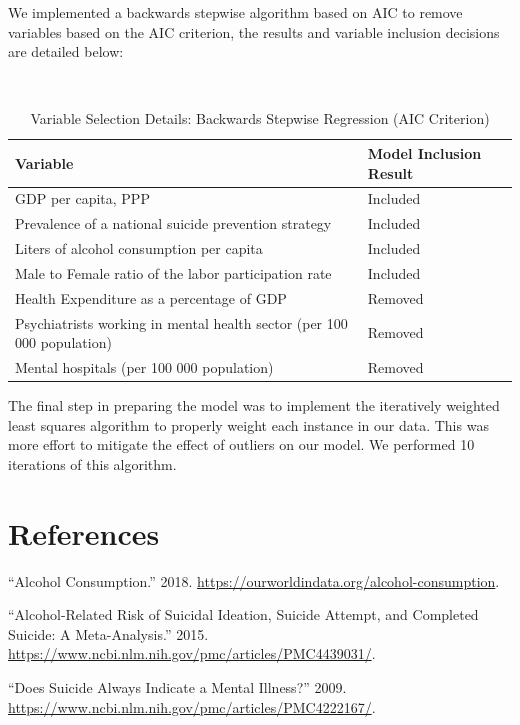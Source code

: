 \documentclass[]{article}
\begin{document}
We implemented a backwards stepwise algorithm based on AIC to remove
variables based on the AIC criterion, the results and variable inclusion
decisions are detailed below:

\begin{table}[H]
\centering 
\caption{Variable Selection Details: Backwards Stepwise Regression (AIC Criterion)}
\
\begin{tabular}{p{5cm}p{4cm}}  
\hline  
Variable & Model Inclusion Result \\  
\hline
GDP per capita, PPP & Included \\
\hline 
Prevalence of a national suicide prevention strategy & Included \\
\hline 
Liters of alcohol consumption per capita & Included \\
\hline 
Male to Female ratio of the labor participation rate & Included \\
\hline
Health Expenditure as a percentage of GDP & Removed \\
 \hline 
Psychiatrists working in mental health sector (per 100 000 population) & Removed \\   
\hline 
Mental hospitals (per 100 000 population) &  Removed \\
\hline 
\end{tabular} 
\end{table}

The final step in preparing the model was to implement the iteratively
weighted least squares algorithm to properly weight each instance in our
data. This was more effort to mitigate the effect of outliers on our
model. We performed 10 iterations of this algorithm.

\section*{References}\label{references}

\hypertarget{refs}{}
\hypertarget{ref-russia2018}{}
``Alcohol Consumption.'' 2018.
\url{https://ourworldindata.org/alcohol-consumption}.

\hypertarget{ref-ideation2015}{}
``Alcohol-Related Risk of Suicidal Ideation, Suicide Attempt, and
Completed Suicide: A Meta-Analysis.'' 2015.
\url{https://www.ncbi.nlm.nih.gov/pmc/articles/PMC4439031/}.

\hypertarget{ref-mental2009}{}
``Does Suicide Always Indicate a Mental Illness?'' 2009.
\url{https://www.ncbi.nlm.nih.gov/pmc/articles/PMC4222167/}.
\end{document}
